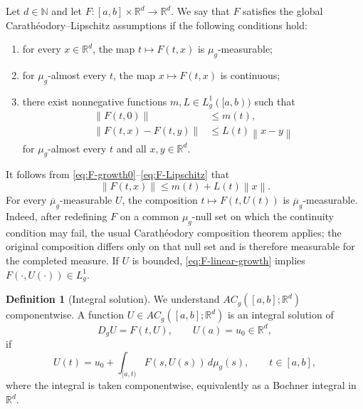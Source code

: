 \documentclass[preprint,12pt]{elsarticle}
\newenvironment{finalrevision}{\begingroup\color{red}}{\endgroup}
\newenvironment{finalrevision}{}{}
\theoremstyle{definition}
\newtheorem{definition}[theorem]{Definition}
\theoremstyle{remark}
\newcommand{\R}{\mathbb R}
\newcommand{\norm}[1]{\left\lVert#1\right\rVert}
\begin{document}
Let $d\in\mathbb N$ and let $F:[a,b]\times\R^d\to\R^d$. We say that $F$ satisfies the global Carath\'eodory--Lipschitz assumptions if the following conditions hold:
\begin{enumerate}[label=\textup{(H\arabic*)}]
 \item for every $x\in\R^d$, the map $t\mapsto F(t,x)$ is $\mu_g$-measurable;
 \item for $\mu_g$-almost every $t$, the map $x\mapsto F(t,x)$ is continuous;
 \item there exist nonnegative functions $m,L\in L_g^1([a,b))$ such that
 \begin{align}
 \norm{F(t,0)}&\le m(t),\label{eq:F-growth0}\\
 \norm{F(t,x)-F(t,y)}&\le L(t)\norm{x-y}\label{eq:F-Lipschitz}
 \end{align}
 for $\mu_g$-almost every $t$ and all $x,y\in\R^d$.
\end{enumerate}
It follows from \eqref{eq:F-growth0}--\eqref{eq:F-Lipschitz} that
\begin{equation}\label{eq:F-linear-growth}
 \norm{F(t,x)}\le m(t)+L(t)\norm{x}.
\end{equation}
\begin{finalrevision}
For every \(\overline{\mu}_g\)-measurable \(U\), the composition
\(t\mapsto F(t,U(t))\) is \(\overline{\mu}_g\)-measurable. Indeed, after
redefining \(F\) on a common \(\mu_g\)-null set on which the continuity
condition may fail, the usual Carath\'eodory composition theorem applies; the
original composition differs only on that null set and is therefore measurable
for the completed measure. If \(U\) is bounded,
\eqref{eq:F-linear-growth} implies
\(F(\cdot,U(\cdot))\in L_g^1\).
\end{finalrevision}

\begin{definition}[Integral solution]\label{def:integral-solution}
We understand $AC_g([a,b];\R^d)$ componentwise. A function
$U\in AC_g([a,b];\R^d)$ is an integral solution of
\begin{equation}\label{eq:nonlinear-general}
 D_gU=F(t,U),\qquad U(a)=u_0\in\R^d,
\end{equation}
if
\begin{equation}\label{eq:integral-equation}
 U(t)=u_0+\int_{[a,t)}F(s,U(s))\,d\mu_g(s),
 \qquad t\in[a,b],
\end{equation}
where the integral is taken componentwise, equivalently as a Bochner integral in $\R^d$.
\end{definition}
\end{document}
